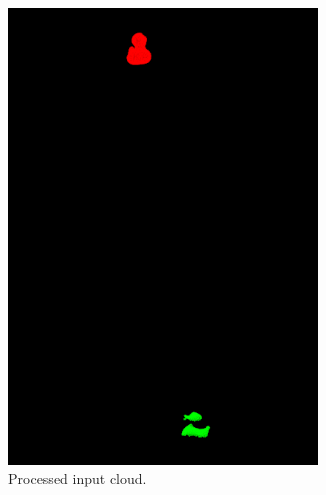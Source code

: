 \documentclass[../main.tex]{subfiles}
\begin{document}
\begin{figure}[H]
\begin{subfigure}[t]{0.2\textwidth}
        \includegraphics[width=0.9\textwidth]{figures/simulated_depth_sensor/scene_after_preprocessing.png}
        \caption{Processed input cloud.}
        \label{subfig:sds_filtered_scene}
    \end{subfigure}
    \begin{subfigure}[t]{0.2\textwidth}
        \centering
        \captionsetup{width=.9\textwidth}

\end{subfigure}
\end{figure}
\end{document}
